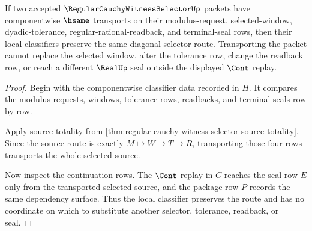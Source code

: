 \begin{theorem}
\label{thm:regular-cauchy-witness-selector-classifier-stability}
If two accepted $\RegularCauchyWitnessSelectorUp$ packets have componentwise $\hsame$ transports on their modulus-request, selected-window, dyadic-tolerance, regular-rational-readback, and terminal-seal rows, then their local classifiers preserve the same diagonal selector route. Transporting the packet cannot replace the selected window, alter the tolerance row, change the readback row, or reach a different $\RealUp$ seal outside the displayed $\Cont$ replay.
\end{theorem}
\begin{proof}
Begin with the componentwise classifier data recorded in $H$. It compares the modulus requests, windows, tolerance rows, readbacks, and terminal seals row by row.

Apply source totality from \autoref{thm:regular-cauchy-witness-selector-source-totality}. Since the source route is exactly $M \mapsto W \mapsto T \mapsto R$, transporting those four rows transports the whole selected source.

Now inspect the continuation rows. The $\Cont$ replay in $C$ reaches the seal row $E$ only from the transported selected source, and the package row $P$ records the same dependency surface. Thus the local classifier preserves the route and has no coordinate on which to substitute another selector, tolerance, readback, or seal.
\end{proof}

